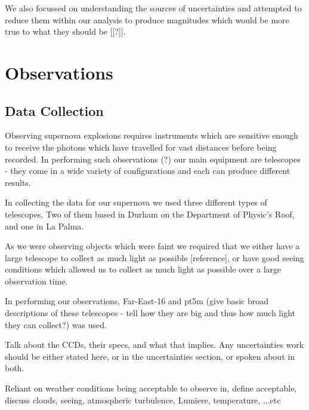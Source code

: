 \documentclass[twocolumn]{revtex4}
\begin{document}
We also focussed on understanding the sources of uncertainties and attempted to reduce them within our analysis to produce magnitudes which would be more true to what they should be [[?]]. 


\vspace{-3ex}
\section{Observations} 
\label{obsver}
\vspace{-2ex}
\subsection{Data Collection}
\vspace{-2ex}

Observing supernova explosions requires instruments which are sensitive enough to receive the photons which have travelled for vast distances before being recorded. In performing such observations (?) our main equipment are telescopes - they come in a wide variety of configurations and each can produce different results.

In collecting the data for our supernova we used three different types of telescopes. Two of them based in Durham on the Department of Physic's Roof, and one in La Palma. 

As we were observing objects which were faint we required that we either have a large telescope to collect as much light as possible [reference], or have good seeing conditions which allowed us to collect as much light as possible over a large observation time.

In performing our observations, Far-East-16 and pt5m (give basic broad descriptions of these telescopes - tell how they are big and thus how much light they can collect?) was used. 

Talk about the CCDs, their specs, and what that implies. Any uncertainties work should be either stated here, or in the uncertainties section, or spoken about in both. 

Reliant on weather conditions being acceptable to observe in, define acceptable, discuss clouds, seeing, atmospheric turbulence, Lumiere, temperature, ...etc
\end{document}
